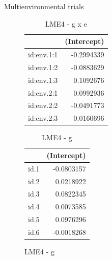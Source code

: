 \documentclass[
  ignorenonframetext,
  aspectratio=169,
]{beamer}
\begin{document}
\begin{frame}{Multienvironmental trials}
\label{multienvironmental-trials-3}
\begin{figure}

\begin{minipage}{0.50\linewidth}

\begingroup\fontsize{10}{12}\selectfont

\begin{longtable}[t]{lr}
\caption{\label{tab:unnamed-chunk-7}LME4 - g x e}\\
\toprule
 & (Intercept)\\
\midrule
id:env.1:1 & -0.2994339\\
id:env.1:2 & -0.0883629\\
id:env.1:3 & 0.1092676\\
id:env.2:1 & 0.0992936\\
id:env.2:2 & -0.0491773\\
\addlinespace
id:env.2:3 & 0.0160696\\
\bottomrule
\end{longtable}
\endgroup{}

\end{minipage}%
%
\begin{minipage}{0.50\linewidth}

\begingroup\fontsize{10}{12}\selectfont

\begin{longtable}[t]{lr}
\caption{\label{tab:unnamed-chunk-8}LME4 - g}\\
\toprule
 & (Intercept)\\
\midrule
id.1 & -0.0803157\\
id.2 & 0.0218922\\
id.3 & 0.0822345\\
id.4 & 0.0073585\\
id.5 & 0.0976296\\
\addlinespace
id.6 & -0.0018268\\
\bottomrule
\end{longtable}
\endgroup{}

\end{minipage}%

\end{figure}%
\end{frame}
\end{document}
